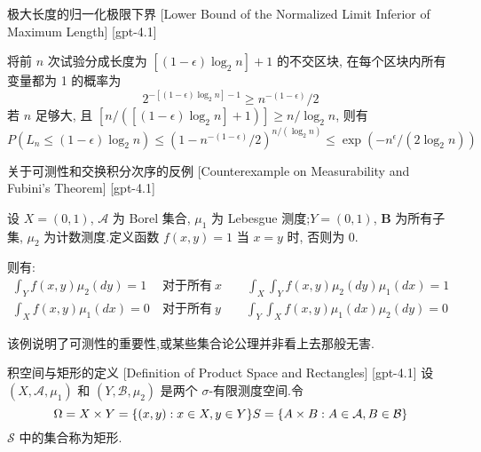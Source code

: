 \documentclass[UTF8]{ctexart}
\begin{document}
    
    
    \begin{crl}
        {极大长度的归一化极限下界}
        [Lower Bound of the Normalized Limit Inferior of Maximum Length]
        [gpt-4.1]
        
将前 $n$ 次试验分成长度为 $[(1-\epsilon)\log_{2} n] + 1$ 的不交区块, 在每个区块内所有变量都为 1 的概率为
\[
2^{-[(1-\epsilon)\log_{2} n] - 1} \geq n^{-(1-\epsilon)} / 2
\]
若 $n$ 足够大, 且 $[n / ([(1-\epsilon)\log_{2} n] + 1)] \geq n / \log_{2} n$, 则有
\[
P(L_{n} \leq (1-\epsilon)\log_{2} n) \leq \left(1 - n^{-(1-\epsilon)}/2 \right)^{n / (\log_{2} n)} \leq \exp\left(- n^{\epsilon} / (2 \log_{2} n)\right)
\]

    \end{crl}
    
    
    
    \begin{xmp}
        {关于可测性和交换积分次序的反例}
        [Counterexample on Measurability and Fubini's Theorem]
        [gpt-4.1]
        
设 $X = (0, 1)$, $\mathcal{A}$ 为 Borel 集合, $\mu_1$ 为 Lebesgue 测度;$Y = (0, 1)$, $\boldsymbol{B}$ 为所有子集, $\mu_2$ 为计数测度.定义函数 $f(x, y) = 1$ 当 $x = y$ 时, 否则为 $0$.

则有:
\[
\begin{array}{rl}
\displaystyle \int_{Y} f(x, y) \mu_2(dy) = 1 & \mathrm{~对于所有~} x \qquad \displaystyle \int_{X} \int_{Y} f(x, y) \mu_2(dy) \mu_1(dx) = 1 \\
\displaystyle \int_{X} f(x, y) \mu_1(dx) = 0 & \mathrm{~对于所有~} y \qquad \displaystyle \int_{Y} \int_{X} f(x, y) \mu_1(dx) \mu_2(dy) = 0
\end{array}
\]

该例说明了可测性的重要性,或某些集合论公理并非看上去那般无害.

    \end{xmp}
    
    
    
    \begin{dfn}
        {积空间与矩形的定义}
        [Definition of Product Space and Rectangles]
        [gpt-4.1]
        设 $(X, \mathcal{A}, \mu_{1})$ 和 $(Y, \mathcal{B}, \mu_{2})$ 是两个 $\sigma$-有限测度空间.令
\[
\Omega = X \times Y = \{ (x, y) : x \in X, y \in Y \} \\
S = \{ A \times B : A \in \mathcal{A}, B \in \mathcal{B} \}
\]
$\mathcal{S}$ 中的集合称为矩形.

    \end{dfn}
    
\end{document}
